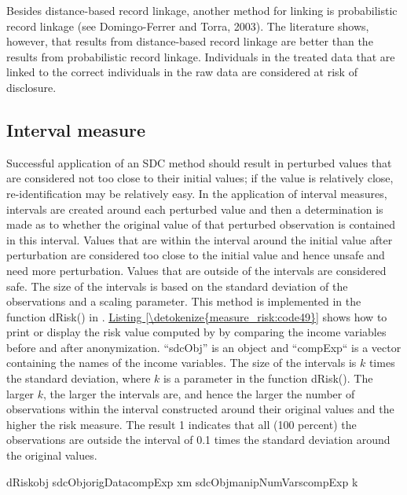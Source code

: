 \documentclass[letterpaper,10pt,english]{sphinxmanual}
\begin{document}
Besides distance-based record linkage, another method for linking is
probabilistic record linkage (see Domingo-Ferrer and Torra, 2003). The
literature shows, however, that results from distance-based record
linkage are better than the results from probabilistic record linkage.
Individuals in the treated data that are linked to the correct
individuals in the raw data are considered at risk of disclosure.


\subsection{Interval measure}
\label{\detokenize{measure_risk:interval-measure}}
Successful application of an SDC method should result in perturbed
values that are considered not too close to their initial values; if the
value is relatively close, re-identification may be relatively easy. In
the application of interval measures, intervals are created around each
perturbed value and then a determination is made as to whether the
original value of that perturbed observation is contained in this
interval. Values that are within the interval around the initial value
after perturbation are considered too close to the initial value and
hence unsafe and need more perturbation. Values that are outside of the
intervals are considered safe. The size of the intervals is based on the
standard deviation of the observations and a scaling parameter. This
method is implemented in the function dRisk() in . \hyperref[\detokenize{measure_risk:code49}]{Listing \ref{\detokenize{measure_risk:code49}}}
shows how to print or display the risk value computed by  by
comparing the income variables before and after anonymization. “sdcObj”
is an  object and “compExp“ is a vector containing the names
of the income variables. The size of the intervals is \(k\) times
the standard deviation, where \(k\) is a parameter in the function
dRisk(). The larger \(k\), the larger the intervals are, and hence
the larger the number of observations within the interval constructed
around their original values and the higher the risk measure. The result
1 indicates that all (100 percent) the observations are outside the
interval of 0.1 times the standard deviation around the original values.

\def\sphinxLiteralBlockLabel{\label{\detokenize{measure_risk:code49}}}
%
\begin{sphinxVerbatim}[commandchars=\\\{\},numbers=left,firstnumber=1,stepnumber=1]
 dRiskobj  sdcObjorigData\PYG{p}{[}compExp\PYG{p}{]} xm  sdcObjmanipNumVars\PYG{p}{[}compExp\PYG{p}{]} k  
 \PYG{p}{[}\PYG{p}{]} 
\end{sphinxVerbatim}
\end{document}
